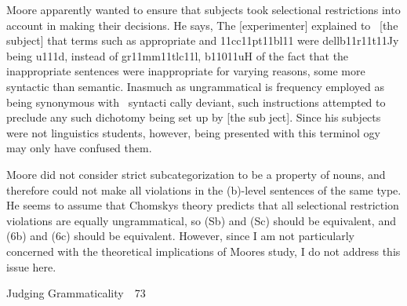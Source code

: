 \setcounter{listWWNumlvleveli}{2}
\begin{listWWNumlvleveli}
\item 
\setcounter{listWWNumlvlevelii}{1}
\begin{listWWNumlvlevelii}
\item 
\setcounter{listWWNumlvleveliii}{0}
\begin{listWWNumlvleveliii}
\item 
\begin{styleStandard}
Moore apparently wanted to ensure that subjects took selectional restrictions into account in making their decisions. He says, {\textquotesingle}The [experimenter] explained to \ [the subject] that terms such as {\textquotesingle}appropriate{\textquotesingle} and {\textquotesingle}11cc11pt11bl11{\textquotesingle} were dellb11r11t11Jy being u111d, instead of {\textquotesingle}gr11mm11tlc11l,{\textquotesingle} b11011uH of the fact that the inappropriate sentences were inappropriate for varying reasons, some more syntactic than semantic. Inasmuch as {\textquotesingle}ungrammatical{\textquotesingle} is frequency employed as being synonymous with \ {\textquotesingle}syntacti\- cally deviant,{\textquotesingle} such instructions attempted to preclude any such dichotomy being set up by [the sub\- ject].{\textquotedbl} Since his subjects were not linguistics students, however, being presented with this terminol\- ogy may only have confused them.
\end{styleStandard}


\item 
\begin{styleStandard}
Moore did not consider strict subcategorization to be a property of nouns, and therefore could not make all violations in the (b)-level sentences of the same type. He seems to assume that Chomsky{\textquotesingle}s theory predicts that all selectional restriction violations are equally ungrammatical, so (Sb) and (Sc) should be equivalent, and (6b) and (6c) should be equivalent. However, since I am not particularly concerned with the theoretical implications of Moore{\textquotesingle}s study, I do not address this issue here.
\end{styleStandard}


\end{listWWNumlvleveliii}
\end{listWWNumlvlevelii}
\end{listWWNumlvleveli}
\clearpage\setcounter{page}{1}\begin{styleStandard}
Judging Grammaticality\ \ 73
\end{styleStandard}


